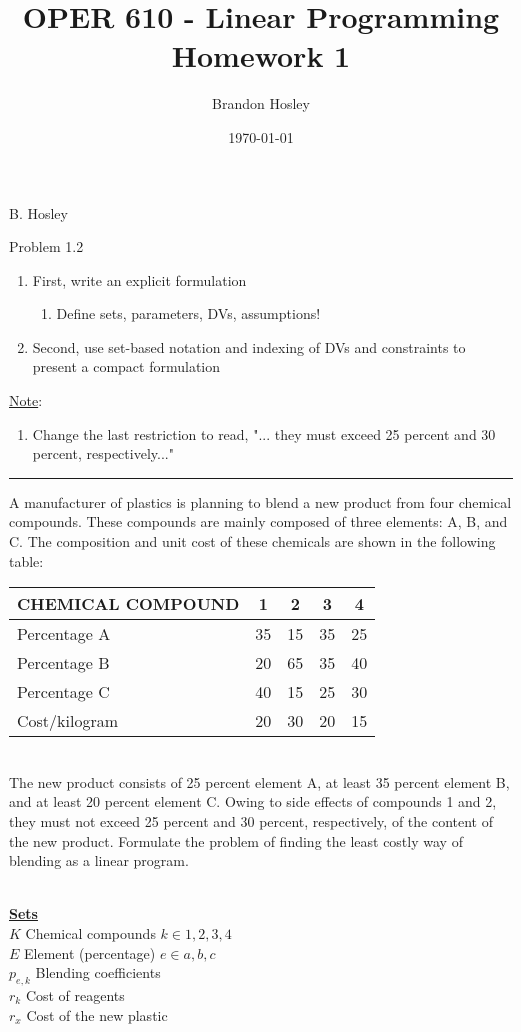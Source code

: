 \documentclass[answers]{exam}
\title{OPER 610 - Linear Programming%
	\\ Homework 1}
\author{Brandon Hosley}
\date{\today}
\begin{document}
\hspace{\fill} { B. Hosley}
\bigskip

\begin{questions}

\question 
Problem 1.2
\begin{enumerate}
	\item First, write an explicit formulation
	\begin{enumerate}
		\item Define sets, parameters, DVs, assumptions!
	\end{enumerate}
\item Second, use set-based notation and indexing of DVs and constraints to present a compact formulation
\end{enumerate}
\underline{Note}:
\begin{enumerate}
	\item Change the last restriction to read, "... they must exceed 25 percent and 30 percent, respectively..."
\end{enumerate}
\hrule
\bigskip
[1.2] A manufacturer of plastics is planning to blend a new product from four chemical compounds. These compounds are mainly composed of three elements: A, B, and C. The composition and unit cost of these chemicals are shown in the following table: \\
\begin{tabular}{lcccc}
	\toprule
	CHEMICAL COMPOUND & 1 & 2 & 3 & 4 \\
	\midrule
	Percentage A  & 35 & 15 & 35 & 25 \\
	Percentage B  & 20 & 65 & 35 & 40 \\
	Percentage C  & 40 & 15 & 25 & 30 \\
	Cost/kilogram & 20 & 30 & 20 & 15 \\
	\bottomrule 
\end{tabular} \\
The new product consists of 25 percent element A, at least 35 percent element B, and at least 20 percent element C. Owing to side effects of compounds 1 and 2, they must not exceed 25 percent and 30 percent, respectively, of the content of the new product. Formulate the problem of finding the least costly way of blending as a linear program.
\begin{solution} \\
	\textbf{\underline{Sets}} \\
	\(K\) Chemical compounds \(k\in{1,2,3,4}\) \\
	\(E\) Element (percentage) \(e\in{a,b,c}\) \\
	\(p_{e,k}\) Blending coefficients \\
	\(r_{k}\) Cost of reagents \\
	\(r_{x}\) Cost of the new plastic \\
	

\end{solution}
\end{questions}
\end{document}
